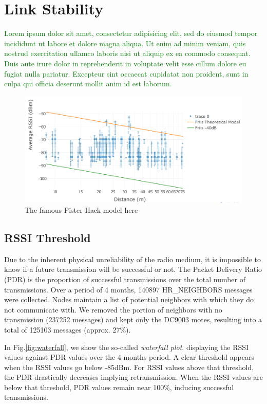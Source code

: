 \documentclass{sig-alternate}
\newcommand{\lorem}               {\textcolor{green}{Lorem ipsum dolor sit amet, consectetur adipisicing elit, sed do eiusmod tempor incididunt ut labore et dolore magna aliqua. Ut enim ad minim veniam, quis nostrud exercitation ullamco laboris nisi ut aliquip ex ea commodo consequat. Duis aute irure dolor in reprehenderit in voluptate velit esse cillum dolore eu fugiat nulla pariatur. Excepteur sint occaecat cupidatat non proident, sunt in culpa qui officia deserunt mollit anim id est laborum.}}
\begin{document}
\section{Link Stability}
\label{sec:link_stability}

\lorem

\begin{figure}
    \centering
    \includegraphics[width=\columnwidth]{pister_hack}
    \caption{The famous Pister-Hack model here}
    \label{fig:pister_hack}
\end{figure}

\subsection{RSSI Threshold}


Due to the inherent physical unreliability of the radio medium, it is impossible to know if a future transmission will be successful or not.
The Packet Delivery Ratio (PDR) is the proportion of successful transmissions over the total number of transmissions.
Over a period of 4 months, 140897 HR\_NEIGHBORS messages were collected.
Nodes maintain a list of potential neighbors with which they do not communicate with.
We removed the portion of neighbors with no transmission (237252 messages) and kept only the DC9003 motes, resulting into a total of 125103 messages (approx. 27\%).


In Fig.\ref{fig:waterfall}, we show the so-called \textit{waterfall plot}, displaying the RSSI values against PDR values over the 4-months period.
A clear threshold appears when the RSSI values go below -85dBm.
For RSSI values above that threshold, the PDR drastically decreases implying retransmission.
When the RSSI values are below that threshold, PDR values remain near 100\%, inducing successful transmissions.
\end{document}
